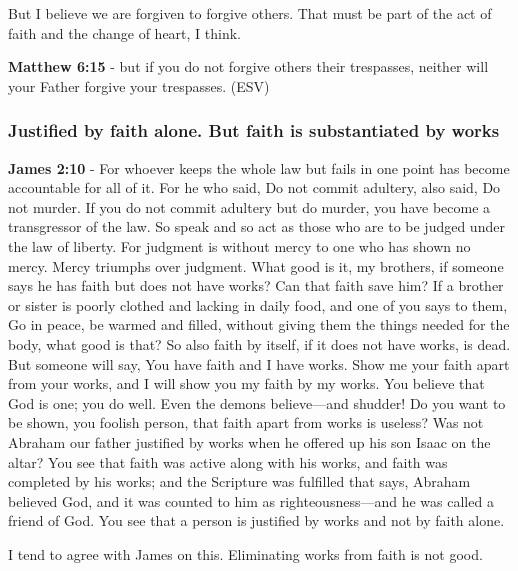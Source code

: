 \documentclass[11pt]{article}
\begin{document}
But I believe we are forgiven to forgive others. That must be part of the act of faith and the change of heart, I think.

\textbf{Matthew 6:15} - but if you do not forgive others their trespasses, neither will your Father forgive your trespasses.  (ESV)

\subsubsection{Justified by faith alone. But faith is substantiated by works}
\label{sec:org65506de}
\textbf{James 2:10} - For whoever keeps the whole law but fails in one point has become accountable for all of it.  For he who said, Do not commit adultery, also said, Do not murder. If you do not commit adultery but do murder, you have become a transgressor of the law.  So speak and so act as those who are to be judged under the law of liberty.  For judgment is without mercy to one who has shown no mercy. Mercy triumphs over judgment.  What good is it, my brothers, if someone says he has faith but does not have works? Can that faith save him?  If a brother or sister is poorly clothed and lacking in daily food, and one of you says to them, Go in peace, be warmed and filled, without giving them the things needed for the body, what good is that?  So also faith by itself, if it does not have works, is dead.  But someone will say, You have faith and I have works. Show me your faith apart from your works, and I will show you my faith by my works.  You believe that God is one; you do well. Even the demons believe—and shudder!  Do you want to be shown, you foolish person, that faith apart from works is useless?  Was not Abraham our father justified by works when he offered up his son Isaac on the altar?  You see that faith was active along with his works, and faith was completed by his works; and the Scripture was fulfilled that says, Abraham believed God, and it was counted to him as righteousness—and he was called a friend of God.  You see that a person is justified by works and not by faith alone.

I tend to agree with James on this.
Eliminating works from faith is not good.
\end{document}
